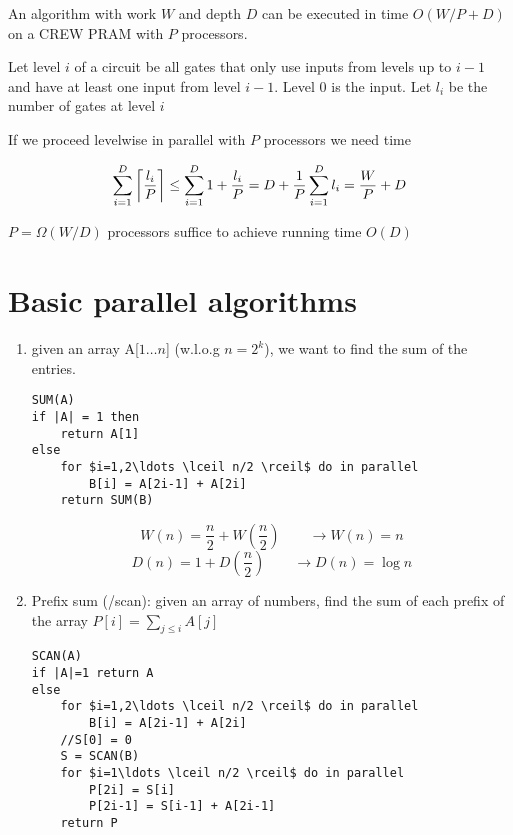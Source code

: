 \begin{thm} An algorithm with work $W$ and depth $D$ can be executed in time $O(W/P+D)$ on a CREW PRAM with $P$ processors.\end{thm}

\begin{pr} Let level $i$ of a circuit be all gates that only use inputs from levels up to $i-1$ and have at least one input from level $i-1$. Level 0 is the input. Let $l_i$ be the number of gates at level $i$

If we proceed levelwise in parallel with $P$ processors we need time

\[\sum_{i=1}^D \left\lceil \frac{l_i}{P} \right\rceil\leq \sum_{i=1}^D 1+\frac{l_i}{P} = D+\frac 1P \sum_{i=1}^D l_i = \frac WP +D\]

\end{pr}

\begin{cor} $P= \Omega(W/D)$ processors suffice to achieve running time $O(D)$\end{cor}

\section{Basic parallel algorithms}

\begin{enumerate}
\item given an array A[$1\ldots n$] (w.l.o.g $n=2^k$), we want to find the sum of the entries. 

\begin{lstlisting}
SUM(A) 
if |A| = 1 then
	return A[1]
else
	for $i=1,2\ldots \lceil n/2 \rceil$ do in parallel
		B[i] = A[2i-1] + A[2i]
	return SUM(B)
\end{lstlisting}

\[W(n) = \frac n2 + W(\frac n2) \qquad \rightarrow W(n) = n\]
\[D(n) = 1 + D(\frac n2) \qquad \rightarrow D(n) = \log n\]
\item Prefix sum (/scan): given an array of numbers, find the sum of each prefix of the array $P[i] = \sum_{j\leq i} A[j]$

\begin{lstlisting}
SCAN(A)
if |A|=1 return A
else
	for $i=1,2\ldots \lceil n/2 \rceil$ do in parallel
		B[i] = A[2i-1] + A[2i]
	//S[0] = 0
	S = SCAN(B)
	for $i=1\ldots \lceil n/2 \rceil$ do in parallel
		P[2i] = S[i]
		P[2i-1] = S[i-1] + A[2i-1]
	return P
\end{lstlisting}

\end{enumerate}
